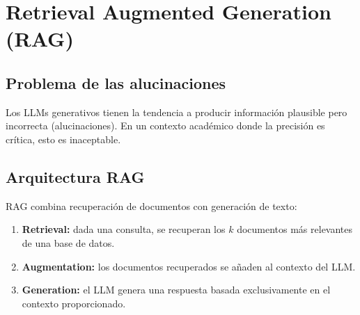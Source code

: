 \documentclass[12pt, a4paper, twoside]{report}
\begin{document}
\section{Retrieval Augmented Generation (RAG)}

\subsection{Problema de las alucinaciones}

Los LLMs generativos tienen la tendencia a producir informaci\'on plausible pero incorrecta (alucinaciones). En un contexto acad\'emico donde la precisi\'on es cr\'itica, esto es inaceptable.

\subsection{Arquitectura RAG}

RAG \cite{lewis2020} combina recuperaci\'on de documentos con generaci\'on de texto:

\begin{enumerate}
  \item \textbf{Retrieval:} dada una consulta, se recuperan los $k$ documentos m\'as relevantes de una base de datos.
  \item \textbf{Augmentation:} los documentos recuperados se a\~naden al contexto del LLM.
  \item \textbf{Generation:} el LLM genera una respuesta basada exclusivamente en el contexto proporcionado.
\end{enumerate}
\end{document}
